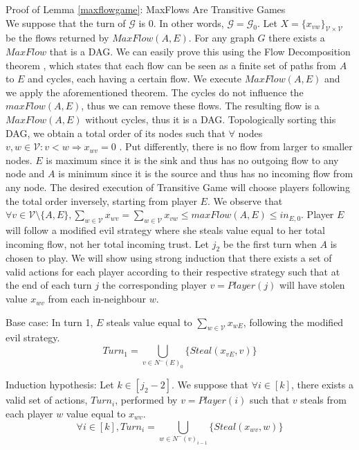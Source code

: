 \begin{sepproof}{Proof of Lemma \ref{maxflowgame}: MaxFlows Are Transitive Games} \ \\
\label{maxflowgameproof}
   We suppose that the turn of $\mathcal{G}$ is 0. In other words, $\mathcal{G} = \mathcal{G}_0$. Let
   $X = \{x_{vw}\}_{\mathcal{V} \times \mathcal{V}}$ be the flows returned by $MaxFlow\left(A, E\right)$. For any graph
   $G$ there exists a $MaxFlow$ that is a DAG. We can easily prove this using the Flow Decomposition theorem
   \cite{amo}, which states that each flow can be seen as a finite set of paths from $A$ to $E$ and cycles, each
   having a certain flow. We execute $MaxFlow\left(A, E\right)$ and we apply the aforementioned theorem. The
   cycles do not influence the $maxFlow\left(A, E\right)$, thus we can remove these flows. The resulting flow is a
   $MaxFlow\left(A, E\right)$ without cycles, thus it is a DAG. Topologically sorting this DAG, we obtain a total order
   of its nodes such that $\forall$ nodes $v, w \in \mathcal{V} : v < w \Rightarrow x_{wv} = 0$ \cite{clrs}. Put
   differently, there is no flow from larger to smaller nodes. $E$ is maximum since it is the sink and thus has no
   outgoing flow to any node and $A$ is minimum since it is the source and thus has no incoming flow from any node. The
   desired execution of Transitive Game will choose players following the total order inversely, starting from player
   $E$. We observe that $\forall v \in \mathcal{V} \setminus \{A, E\}, \sum\limits_{w \in \mathcal{V}}x_{wv} =
   \sum\limits_{w \in \mathcal{V}}x_{vw} \leq maxFlow\left(A, E\right) \leq in_{E, 0}$. Player $E$ will follow a modified
   evil strategy where she steals value equal to her total incoming flow, not her total incoming trust. Let $j_2$ be the
   first turn when $A$ is chosen to play. We will show using strong induction that there exists a set of valid actions
   for each player according to their respective strategy such that at the end of each turn $j$ the corresponding player
   $v = Player\left(j\right)$ will have stolen value $x_{wv}$ from each in-neighbour $w$.

   Base case: In turn 1, $E$ steals value equal to $\sum\limits_{w \in \mathcal{V}}x_{wE}$, following the modified evil
   strategy.
   \begin{equation*}
      Turn_1 = \bigcup\limits_{v \in N^{-}\left(E\right)_0}\{Steal\left(x_{vE}, v\right)\}
   \end{equation*}

   Induction hypothesis: Let $k \in [j_2 - 2]$. We suppose that $\forall i \in [k]$, there exists a valid set of actions,
   $Turn_i$, performed by $v = Player\left(i\right)$ such that $v$ steals from each player $w$ value equal to $x_{wv}$.
   \begin{equation*}
      \forall i \in [k], Turn_i = \bigcup\limits_{w \in N^{-}\left(v\right)_{i-1}}\{Steal\left(x_{wv}, w\right)\}
   \end{equation*}


\end{sepproof}
